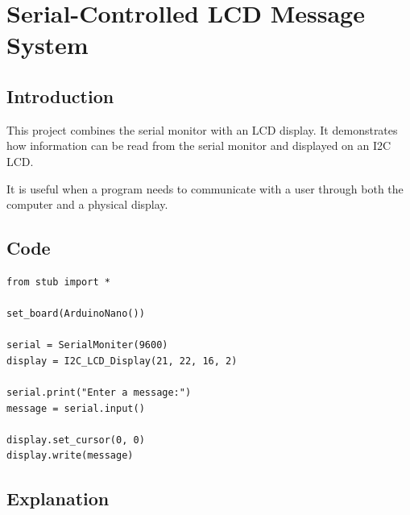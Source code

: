 \newpage

\section{Serial-Controlled LCD Message System}

\subsection{Introduction}

This project combines the serial monitor with an LCD display. It demonstrates
how information can be read from the serial monitor and displayed on an
I2C LCD.

It is useful when a program needs to communicate with a user through both
the computer and a physical display.

\subsection{Code}

\begin{lstlisting}
from stub import *

set_board(ArduinoNano())

serial = SerialMoniter(9600)
display = I2C_LCD_Display(21, 22, 16, 2)

serial.print("Enter a message:")
message = serial.input()

display.set_cursor(0, 0)
display.write(message)
\end{lstlisting}

\subsection{Explanation}

